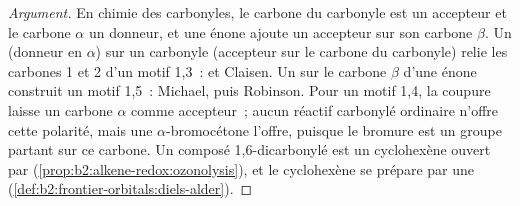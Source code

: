 \begin{proof}[Argument]
En chimie des carbonyles, le carbone du carbonyle est un accepteur et le carbone $\alpha$ un donneur, et
une énone ajoute un accepteur sur son carbone $\beta$. Un  (donneur en $\alpha$) sur un carbonyle
(accepteur sur le carbone du carbonyle) relie les carbones 1 et 2 d'un motif 1,3~:  et
Claisen. Un  sur le carbone $\beta$ d'une énone construit un motif 1,5~: Michael, puis Robinson.
Pour un motif 1,4, la coupure laisse un carbone $\alpha$ comme accepteur~; aucun réactif carbonylé
ordinaire n'offre cette polarité, mais une $\alpha$-bromocétone l'offre, puisque le bromure est un groupe
partant sur ce carbone. Un composé 1,6-dicarbonylé est un cyclohexène ouvert par 
(\cref{prop:b2:alkene-redox:ozonolysis}), et le cyclohexène se prépare par une 
(\cref{def:b2:frontier-orbitals:diels-alder}).
\end{proof}

